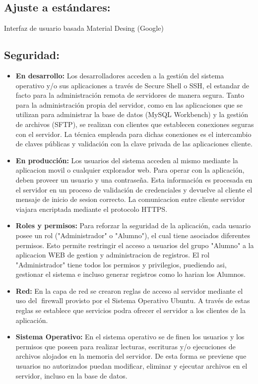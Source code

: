     \subsection{Ajuste a estándares:} Interfaz de usuario basada Material Desing (Google)

    \subsection{Seguridad:} 
      \begin{itemize}
        
        \item \textbf{En desarrollo:} Los desarrolladores acceden a la gestión del sistema operativo y/o sus aplicaciones a través de Secure Shell o SSH, el estandar de facto para la administración remota de servidores de manera segura. Tanto para la administración propia del servidor, como en las aplicaciones que se utilizan para administrar la base de datos (MySQL Workbench) y la gestión de archivos (SFTP), se realizan con clientes que establecen conexiones seguras con el servidor. La técnica empleada para dichas conexiones es el intercambio de claves públicas y validación con la clave privada de las aplicaciones cliente.
        \item \textbf{En producción:} Los usuarios del sistema acceden al mismo mediante la aplicacion movil o cualquier explorador web. Para operar con la aplicación, deben proveer un usuario y una contraseña. Esta información es procesada en el servidor en un proceso de validación de credenciales y devuelve al cliente el mensaje de inicio de sesion correcto. La comunicacion entre cliente servidor viajara encriptada mediante el protocolo HTTPS.
        \item \textbf{Roles y permisos:} Para reforzar la seguridad de la aplicación, cada usuario posee un rol ("Administrador" o "Alumno"), el cual tiene asociados diferentes permisos. Esto permite restringir el acceso a usuarios del grupo "Alumno" a la aplicacion WEB de gestion y administracion de registros. El rol "Administrador" tiene todos los permisos y privilegios, puediendo asi, gestionar el sistema e incluso generar registros como lo harian los Alumnos.
        \item \textbf{Red:} En la capa de red se crearon reglas de acceso al servidor mediante el uso del firewall provisto por el Sistema Operativo Ubuntu. A través de estas reglas se establece que servicios podra ofrecer el servidor a los clientes de la aplicación.
        \item \textbf{Sistema Operativo:} En el sistema operativo se definen los usuarios y los permisos que poseen para realizar lecturas, escrituras y/o ejecuciones de archivos alojados en la memoria del servidor. De esta forma se previene que usuarios no autorizados puedan modificar, eliminar y ejecutar archivos en el servidor, incluso en la base de datos.

\end{itemize}
